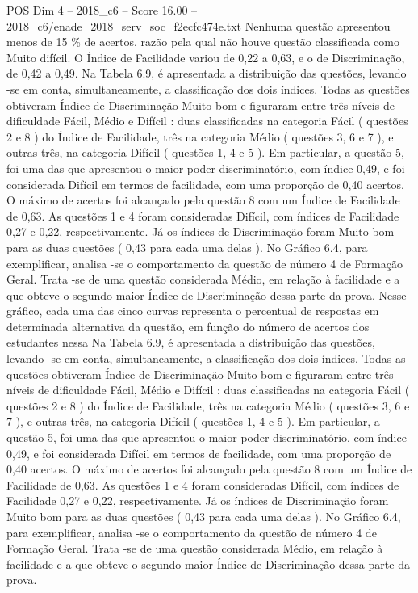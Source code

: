 \begin{textsample}{POS Dim 4 – 2018\_c6 – Score 16.00 – 2018\_c6/enade\_2018\_serv\_soc\_f2ecfc474e.txt}
Nenhuma questão apresentou menos de 15 \% de acertos, razão pela qual não houve questão classificada como Muito difícil.
O Índice de Facilidade variou de 0,22 a 0,63, e o de Discriminação, de 0,42 a 0,49.
Na Tabela 6.9, é apresentada a distribuição das questões, levando -se em conta, simultaneamente, a classificação dos dois índices.
Todas as questões obtiveram Índice de Discriminação Muito bom e figuraram entre três níveis de dificuldade Fácil, Médio e Difícil : duas classificadas na categoria Fácil ( questões 2 e 8 ) do Índice de Facilidade, três na categoria Médio ( questões 3, 6 e 7 ), e outras três, na categoria Difícil ( questões 1, 4 e 5 ).
Em particular, a questão 5, foi uma das que apresentou o maior poder discriminatório, com índice 0,49, e foi considerada Difícil em termos de facilidade, com uma proporção de 0,40 acertos.
O máximo de acertos foi alcançado pela questão 8 com um Índice de Facilidade de 0,63.
As questões 1 e 4 foram consideradas Difícil, com índices de Facilidade 0,27 e 0,22, respectivamente.
Já os índices de Discriminação foram Muito bom para as duas questões ( 0,43 para cada uma delas ).
No Gráfico 6.4, para exemplificar, analisa -se o comportamento da questão de número 4 de Formação Geral.
Trata -se de uma questão considerada Médio, em relação à facilidade e a que obteve o segundo maior Índice de Discriminação dessa parte da prova.
Nesse gráfico, cada uma das cinco curvas representa o percentual de respostas em determinada alternativa da questão, em função do número de acertos dos estudantes nessa Na Tabela 6.9, é apresentada a distribuição das questões, levando -se em conta, simultaneamente, a classificação dos dois índices.
Todas as questões obtiveram Índice de Discriminação Muito bom e figuraram entre três níveis de dificuldade Fácil, Médio e Difícil : duas classificadas na categoria Fácil ( questões 2 e 8 ) do Índice de Facilidade, três na categoria Médio ( questões 3, 6 e 7 ), e outras três, na categoria Difícil ( questões 1, 4 e 5 ).
Em particular, a questão 5, foi uma das que apresentou o maior poder discriminatório, com índice 0,49, e foi considerada Difícil em termos de facilidade, com uma proporção de 0,40 acertos.
O máximo de acertos foi alcançado pela questão 8 com um Índice de Facilidade de 0,63.
As questões 1 e 4 foram consideradas Difícil, com índices de Facilidade 0,27 e 0,22, respectivamente.
Já os índices de Discriminação foram Muito bom para as duas questões ( 0,43 para cada uma delas ).
No Gráfico 6.4, para exemplificar, analisa -se o comportamento da questão de número 4 de Formação Geral.
Trata -se de uma questão considerada Médio, em relação à facilidade e a que obteve o segundo maior Índice de Discriminação dessa parte da prova.

\end{textsample}
